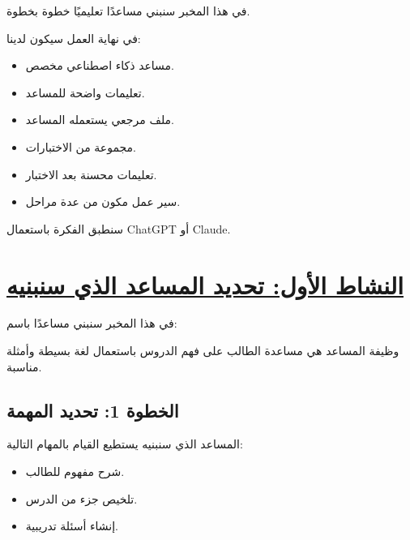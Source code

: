 \documentclass[a4paper]{article}
\begin{document}
في هذا المخبر سنبني مساعدًا تعليميًا خطوة بخطوة.

في نهاية العمل سيكون لدينا:

\begin{itemize}

    \item مساعد ذكاء اصطناعي مخصص.

    \item تعليمات واضحة للمساعد.

    \item ملف مرجعي يستعمله المساعد.

    \item مجموعة من الاختبارات.

    \item تعليمات محسنة بعد الاختبار.

    \item سير عمل مكون من عدة مراحل.

\end{itemize}

سنطبق الفكرة باستعمال
\textenglish{ChatGPT} أو \textenglish{Claude}.



\section*{\khatt\underline{النشاط الأول: تحديد المساعد الذي سنبنيه}}

في هذا المخبر سنبني مساعدًا باسم:

\begin{center}


\end{center}

وظيفة المساعد هي مساعدة الطالب على فهم الدروس
باستعمال لغة بسيطة وأمثلة مناسبة.

\subsection*{\khatt الخطوة 1: تحديد المهمة}

المساعد الذي سنبنيه يستطيع القيام بالمهام التالية:

\begin{itemize}

    \item شرح مفهوم للطالب.

    \item تلخيص جزء من الدرس.

    \item إنشاء أسئلة تدريبية.

\end{itemize}
\end{document}
